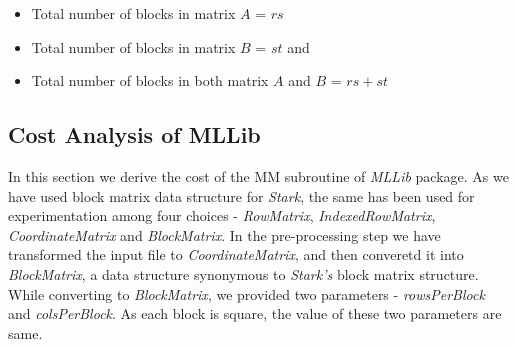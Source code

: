 \begin{itemize}
    \item Total number of blocks in matrix $A$ = \textit{$rs$}
    \item Total number of blocks in matrix $B$ = \textit{$st$} and 
    \item Total number of blocks in both matrix $A$ and $B$ = \textit{$rs + st$}
\end{itemize}

\subsection{Cost Analysis of MLLib}
In this section we derive the cost of the MM subroutine of \textit{MLLib} package. As we have used block matrix data structure for \textit{Stark}, the same has been used for experimentation among four choices - \textit{RowMatrix}, \textit{IndexedRowMatrix}, \textit{CoordinateMatrix} and \textit{BlockMatrix}. In the pre-processing step we have transformed the input file to \textit{CoordinateMatrix}, and then converetd it into \textit{BlockMatrix}, a data structure synonymous to \textit{Stark's} block matrix structure. While converting to \textit{BlockMatrix}, we provided two parameters - \textit{rowsPerBlock} and \textit{colsPerBlock}. As each block is square, the value of these two parameters are same.

